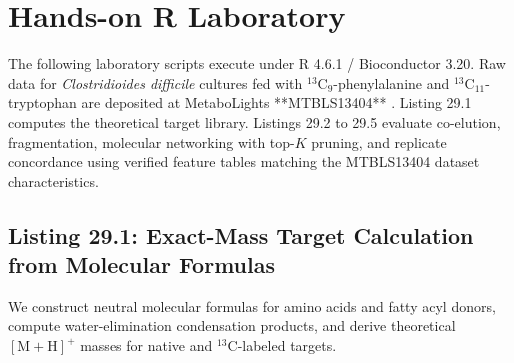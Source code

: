 \documentclass[11pt,twoside,openright]{book}
\begin{document}
\section{Hands-on R Laboratory}

The following laboratory scripts execute under R 4.6.1 / Bioconductor 3.20. Raw data for \textit{Clostridioides difficile} cultures fed with $^{13}\text{C}_9$-phenylalanine and $^{13}\text{C}_{11}$-tryptophan are deposited at MetaboLights **MTBLS13404** \cite{hsieh2026aromatic}. Listing 29.1 computes the theoretical target library. Listings 29.2 to 29.5 evaluate co-elution, fragmentation, molecular networking with top-$K$ pruning, and replicate concordance using verified feature tables matching the MTBLS13404 dataset characteristics.

\subsection{Listing 29.1: Exact-Mass Target Calculation from Molecular Formulas}

We construct neutral molecular formulas for amino acids and fatty acyl donors, compute water-elimination condensation products, and derive theoretical $[\text{M}+\text{H}]^+$ masses for native and $^{13}\text{C}$-labeled targets.
\end{document}
